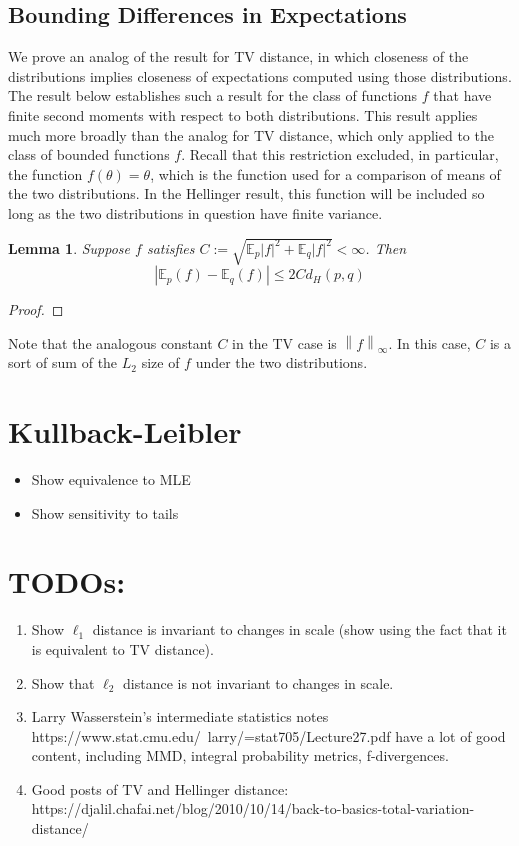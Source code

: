 \documentclass[12pt]{article}
\newcommand*{\norm}[1]{\left\lVert#1\right\rVert}
\newcommand*{\abs}[1]{\left\lvert#1\right\rvert}
\newcommand{\E}{\mathbb{E}}
\newtheorem{lemma}{Lemma}
\begin{document}
\subsection{Bounding Differences in Expectations}
We prove an analog of the result for TV distance, in which closeness of the distributions implies closeness of expectations computed using those distributions. The 
result below establishes such a result for the class of functions $f$ that have finite second moments with respect to both distributions. This result applies much more broadly 
than the analog for TV distance, which only applied to the class of bounded functions $f$. Recall that this restriction excluded, in particular, the function $f(\theta) = \theta$, which 
is the function used for a comparison of means of the two distributions. In the Hellinger result, this function will be included so long as the two distributions in question have 
finite variance. 

\begin{lemma} 
Suppose $f$ satisfies $C := \sqrt{\E_p\abs{f}^2 + \E_q\abs{f}^2} < \infty$. Then 
\[\abs{\E_p(f) - \E_q(f)} \leq 2C d_H(p, q)\]
\end{lemma}

\begin{proof}

\end{proof}

Note that the analogous constant $C$ in the TV case is $\norm{f}_\infty$. In this case, $C$ is a sort of sum of the $L_2$ size of $f$ under the two distributions. 




\section{Kullback-Leibler }
\begin{itemize}
\item Show equivalence to MLE
\item Show sensitivity to tails 
\end{itemize}



\section{TODOs:}
\begin{enumerate}
\item Show $\ell_1$ distance is invariant to changes in scale (show using the fact that it is equivalent to TV distance). 
\item Show that $\ell_2$ distance is not invariant to changes in scale. 
\item Larry Wasserstein's intermediate statistics notes https://www.stat.cmu.edu/~larry/=stat705/Lecture27.pdf have a lot of good content, including MMD, integral probability metrics, f-divergences. 
\item Good posts of TV and Hellinger distance: https://djalil.chafai.net/blog/2010/10/14/back-to-basics-total-variation-distance/
\end{enumerate}
\end{document}
